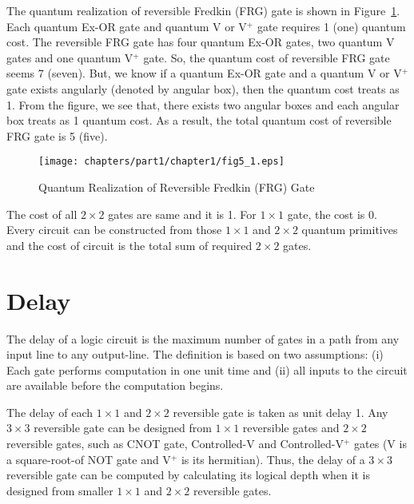 \begin{example}\textnormal{
The quantum realization of reversible Fredkin (FRG) gate is shown in Figure~\ref{fig:p1_c1_fig5_1}. Each quantum Ex-OR gate and quantum V or V$^+$ gate requires 1 (one) quantum cost. The reversible FRG gate has four quantum Ex-OR gates, two quantum V gates and one quantum V$^+$ gate. So, the quantum cost of reversible FRG gate seems 7 (seven). But, we know if a quantum Ex-OR gate and a quantum V or V$^+$ gate exists angularly (denoted by angular box), then the quantum cost treats as 1. From the figure, we see that, there exists two angular boxes and each angular box treats as 1 quantum cost. As a result, the total quantum cost of reversible FRG gate is 5 (five).}
\end{example}

\begin{figure}[H]
\centering
\texttt{[image: chapters/part1/chapter1/fig5\_1.eps]}
\caption{Quantum Realization of Reversible Fredkin (FRG) Gate}
\label{fig:p1_c1_fig5_1}
\end{figure}
\begin{example}\textnormal{
The cost of all $2 \times 2$ gates are same and it is 1. For $1 \times 1$ gate, the cost is 0. Every circuit can be constructed from those $1 \times 1$ and $2 \times 2$ quantum primitives and the cost of circuit is the total sum of required $2 \times 2$ gates.}
\end{example}
\section{Delay}
The delay of a logic circuit is the maximum number of gates in a path from any input line to any output-line. The definition is based on two assumptions: (i) Each gate performs computation in one unit time and (ii) all inputs to the circuit are available before the computation begins.


\begin{example}\textnormal{
The delay of each $1 \times 1$ and $2 \times 2$ reversible gate is taken as unit delay 1. Any $3 \times 3$ reversible gate can be designed from $1 \times 1$ reversible gates and $2\times 2$ reversible gates, such as CNOT gate, Controlled-V and Controlled-V$^+$ gates (V is a square-root-of NOT gate and V$^+$ is its hermitian). Thus, the delay of a $3 \times 3$ reversible gate can be computed by calculating its logical depth when it is designed from smaller $1 \times 1$ and $2 \times 2$ reversible gates.}
\end{example}

